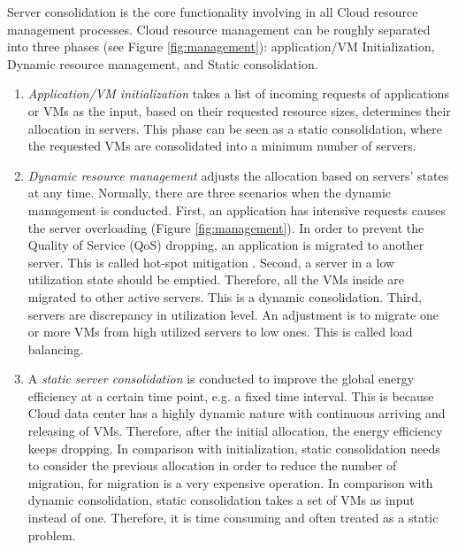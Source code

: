 Server consolidation is the core functionality involving in all Cloud resource management processes. Cloud resource management can be roughly separated into three phases \cite{Svard:2015ic, Mishra:2012kx} (see Figure \ref{fig:management}): application/VM Initialization, Dynamic resource management, and Static consolidation. 
\begin{enumerate}
	\item \emph{Application/VM initialization} takes a list of incoming requests of applications or VMs as the input, based on their requested resource sizes, determines their allocation in servers. This phase can be seen as a static consolidation, where the requested VMs are consolidated into a minimum number of servers.
	\item \emph{Dynamic resource management} adjusts the allocation based on servers' states at any time. Normally, there are three scenarios when the dynamic management is conducted. First, an application has intensive requests causes the server overloading (Figure \ref{fig:management}). In order to prevent the Quality of Service (QoS) dropping, an application is migrated to another server. This is called hot-spot mitigation \cite{Mishra:2012kx}. Second, a server in a low utilization state should be emptied. Therefore, all the VMs inside are migrated to other active servers. This is a dynamic consolidation. Third, servers are discrepancy in utilization level. An adjustment is to migrate one or more VMs from high utilized servers to low ones. This is called load balancing.
	\item A \emph{static server consolidation} is conducted to improve the global energy efficiency at a certain time point, e.g. a fixed time interval. This is because Cloud data center has a highly dynamic nature with continuous arriving and releasing of VMs. Therefore, after the initial allocation, the energy efficiency keeps dropping. In comparison with initialization, static consolidation needs to consider the previous allocation in order to reduce the number of migration, for migration is a very expensive operation. In comparison with dynamic consolidation, static consolidation takes a set of VMs as input instead of one. Therefore, it is time consuming and often treated as a static problem.
\end{enumerate}

